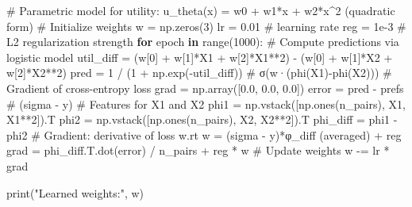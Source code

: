\documentclass[
  letterpaper,
  numbers=noenddot,
  DIV=11]{scrreprt}
\newenvironment{Shaded}{\begin{snugshade}}{\end{snugshade}}
\newcommand{\BuiltInTok}[1]{\textcolor[rgb]{0.00,0.23,0.31}{#1}}
\newcommand{\CommentTok}[1]{\textcolor[rgb]{0.37,0.37,0.37}{#1}}
\newcommand{\ControlFlowTok}[1]{\textcolor[rgb]{0.00,0.23,0.31}{\textbf{#1}}}
\newcommand{\DecValTok}[1]{\textcolor[rgb]{0.68,0.00,0.00}{#1}}
\newcommand{\FloatTok}[1]{\textcolor[rgb]{0.68,0.00,0.00}{#1}}
\newcommand{\KeywordTok}[1]{\textcolor[rgb]{0.00,0.23,0.31}{\textbf{#1}}}
\newcommand{\NormalTok}[1]{\textcolor[rgb]{0.00,0.23,0.31}{#1}}
\newcommand{\OperatorTok}[1]{\textcolor[rgb]{0.37,0.37,0.37}{#1}}
\newcommand{\StringTok}[1]{\textcolor[rgb]{0.13,0.47,0.30}{#1}}
\theoremstyle{plain}
\theoremstyle{definition}
\theoremstyle{remark}
\begin{document}
\begin{Shaded}
\begin{Highlighting}[numbers=left,,]
\CommentTok{\# Parametric model for utility: u\_theta(x) = w0 + w1*x + w2*x\^{}2  (quadratic form)}
\CommentTok{\# Initialize weights}
\NormalTok{w }\OperatorTok{=}\NormalTok{ np.zeros(}\DecValTok{3}\NormalTok{)}
\NormalTok{lr }\OperatorTok{=} \FloatTok{0.01}       \CommentTok{\# learning rate}
\NormalTok{reg }\OperatorTok{=} \FloatTok{1e{-}3}      \CommentTok{\# L2 regularization strength}
\ControlFlowTok{for}\NormalTok{ epoch }\KeywordTok{in} \BuiltInTok{range}\NormalTok{(}\DecValTok{1000}\NormalTok{):}
    \CommentTok{\# Compute predictions via logistic model}
\NormalTok{    util\_diff }\OperatorTok{=}\NormalTok{ (w[}\DecValTok{0}\NormalTok{] }\OperatorTok{+}\NormalTok{ w[}\DecValTok{1}\NormalTok{]}\OperatorTok{*}\NormalTok{X1 }\OperatorTok{+}\NormalTok{ w[}\DecValTok{2}\NormalTok{]}\OperatorTok{*}\NormalTok{X1}\OperatorTok{**}\DecValTok{2}\NormalTok{) }\OperatorTok{{-}}\NormalTok{ (w[}\DecValTok{0}\NormalTok{] }\OperatorTok{+}\NormalTok{ w[}\DecValTok{1}\NormalTok{]}\OperatorTok{*}\NormalTok{X2 }\OperatorTok{+}\NormalTok{ w[}\DecValTok{2}\NormalTok{]}\OperatorTok{*}\NormalTok{X2}\OperatorTok{**}\DecValTok{2}\NormalTok{)}
\NormalTok{    pred }\OperatorTok{=} \DecValTok{1} \OperatorTok{/}\NormalTok{ (}\DecValTok{1} \OperatorTok{+}\NormalTok{ np.exp(}\OperatorTok{{-}}\NormalTok{util\_diff))      }\CommentTok{\# σ(w·(phi(X1){-}phi(X2)))}
    \CommentTok{\# Gradient of cross{-}entropy loss}
\NormalTok{    grad }\OperatorTok{=}\NormalTok{ np.array([}\FloatTok{0.0}\NormalTok{, }\FloatTok{0.0}\NormalTok{, }\FloatTok{0.0}\NormalTok{])}
\NormalTok{    error }\OperatorTok{=}\NormalTok{ pred }\OperatorTok{{-}}\NormalTok{ prefs  }\CommentTok{\# (sigma {-} y)}
    \CommentTok{\# Features for X1 and X2}
\NormalTok{    phi1 }\OperatorTok{=}\NormalTok{ np.vstack([np.ones(n\_pairs), X1, X1}\OperatorTok{**}\DecValTok{2}\NormalTok{]).T}
\NormalTok{    phi2 }\OperatorTok{=}\NormalTok{ np.vstack([np.ones(n\_pairs), X2, X2}\OperatorTok{**}\DecValTok{2}\NormalTok{]).T}
\NormalTok{    phi\_diff }\OperatorTok{=}\NormalTok{ phi1 }\OperatorTok{{-}}\NormalTok{ phi2}
    \CommentTok{\# Gradient: derivative of loss w.rt w = (sigma {-} y)*φ\_diff (averaged) + reg}
\NormalTok{    grad }\OperatorTok{=}\NormalTok{ phi\_diff.T.dot(error) }\OperatorTok{/}\NormalTok{ n\_pairs }\OperatorTok{+}\NormalTok{ reg }\OperatorTok{*}\NormalTok{ w}
    \CommentTok{\# Update weights}
\NormalTok{    w }\OperatorTok{{-}=}\NormalTok{ lr }\OperatorTok{*}\NormalTok{ grad}

\BuiltInTok{print}\NormalTok{(}\StringTok{"Learned weights:"}\NormalTok{, w)}
\end{Highlighting}
\end{Shaded}
\end{document}
